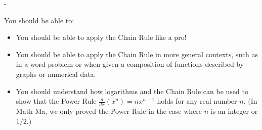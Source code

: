 \documentclass{article}
\makeatletter
\newlength{\tipmargin}
\renewenvironment{framed}{
  \setlength{\tipmargin}{\textwidth-\linewidth}
  \advance\@totalleftmargin-\tipmargin
  \def\FrameCommand{\hspace{\tipmargin}\fbox}%
  \advance\linewidth\tipmargin
  \MakeFramed {\advance\hsize-\width \FrameRestore}%
}
{\endMakeFramed}
\makeatother
\begin{document}
\begin{problemonly}
    \begin{framed}

You should be able to:

\begin{itemize}[topsep=0pt,partopsep=0pt,parsep=8pt,itemsep=0pt]

\item You should be able to apply the Chain Rule like a pro!

\item You should be able to apply the Chain Rule in more general contexts,
  such as in a word problem or when given a composition of functions
  described by graphs or numerical data.

\item You should understand how logarithms and the Chain Rule can be used
  to show that the Power Rule $\tfrac{d}{dx} \left( x^n \right) =
  nx^{n-1}$ holds for any real number $n$.  (In Math Ma, we only proved
  the Power Rule in the case where $n$ is an integer or $1/2$.)

\end{itemize} 

    \end{framed}
\end{problemonly}
\end{document}

